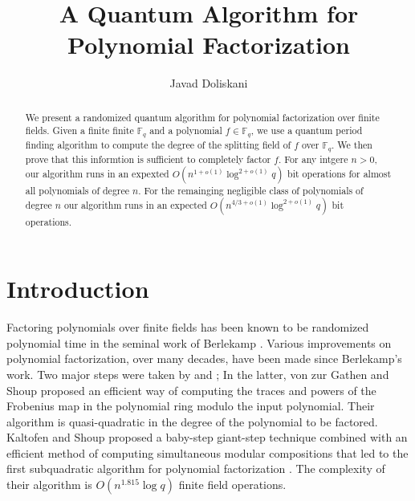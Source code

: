 \documentclass{article}
\title{A Quantum Algorithm for Polynomial Factorization}
\author[1]{Javad Doliskani}
\affil[1]{\small Institute for Quantum Computing, University of Waterloo}
\date{}
\theoremstyle{plain}
\theoremstyle{definition}
\begin{document}
\maketitle

\begin{abstract}
We present a randomized quantum algorithm for polynomial factorization over finite fields. 
Given a finite finite $\mathbb{F}_q$ and a polynomial $f \in \mathbb{F}_q$, we use a quantum 
period finding algorithm to compute the degree of the splitting field of $f$ over 
$\mathbb{F}_q$. We then prove that this informtion is sufficient to completely factor $f$. For 
any intgere $n > 0$, our algorithm runs in an expexted $O(n^{1 + o(1)} \log^{2 + o(1)}q)$ bit 
operations for almost all polynomials of degree $n$. For the remainging negligible class of 
polynomials of degree $n$ our algorithm runs in an expected $O(n^{4 / 3 + o(1)} \log^{2 + 
o(1)}q)$ bit operations.
\end{abstract}




\section{Introduction}
\label{sec:intro}

Factoring polynomials over finite fields has been known to be randomized polynomial time in the 
seminal work of Berlekamp \cite{Berlekamp70}. Various improvements on polynomial factorization, 
over many decades, have been made since Berlekamp's work. Two major steps were taken by 
\cite{cantor1981new} and \cite{von1992computing}; In the latter, von zur Gathen and Shoup proposed 
an efficient way of computing the traces and powers of the Frobenius map in the polynomial ring 
modulo the input polynomial. Their algorithm is quasi-quadratic in the degree of the polynomial to 
be factored. Kaltofen and Shoup proposed a baby-step giant-step technique combined with an 
efficient method of computing simultaneous modular compositions that led to the first subquadratic 
algorithm for polynomial factorization \cite{KaSh98}. The complexity of their algorithm is 
$O(n^{1.815}\log q)$ finite field operations. 
\end{document}
